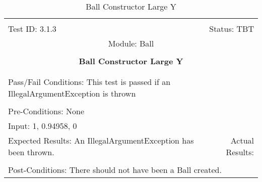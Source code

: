 \documentclass[titlepage]{article}
\begin{document}
\begin{center}%
\begin{table}
\begin{tabular}{|l r|}\hline&\\[-2mm]
	Test ID: 3.1.3	&Status: TBT\\[-3mm]
	\multicolumn{2}{|c|}{Module: Ball}\\&\\
	\multicolumn{2}{|c|}{\textbf{\large{Ball Constructor Large Y}}}\\&\\\hline&\\[-3mm]
	\multicolumn{2}{|p{\textwidth}|}{Pass/Fail Conditions: This test is passed if an IllegalArgumentException is thrown}\\[1mm]\hline&\\[-3mm]
	\multicolumn{2}{|p{\textwidth}|}{Pre-Conditions: None}\\[4mm]
	\multicolumn{2}{|p{\textwidth}|}{Input: 1, 0.94958, 0}\\[2mm]\hline
	\multicolumn{1}{|p{0.49\textwidth}}{Expected Results: An IllegalArgumentException has been thrown.}	&\multicolumn{1}{|p{0.45\textwidth}|}{Actual Results:}\\\hline&\\[-3mm]
	\multicolumn{2}{|p{\textwidth}|}{Post-Conditions: There should not have been a Ball created.}\\\hline
\end{tabular}
\caption{Ball Constructor Large Y}
\end{table}
\end{center}
\end{document}
